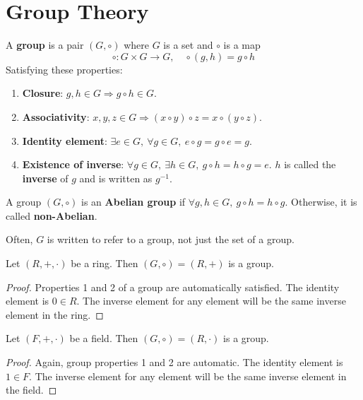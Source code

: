 \section{Group Theory}

\begin{definition}\label{def:group}
	A \textbf{group} is a pair $(G, \circ)$ where $G$ is a set and $\circ$ is a map
	\[
		\circ: G \times G \rightarrow G, \quad \circ (g, h) = g \circ h
	\]
	Satisfying these properties:
	\begin{enumerate}
		\item \textbf{Closure}: $g, h \in G \Rightarrow g \circ h \in G$.
		\item \textbf{Associativity}: $x, y, z \in G \Rightarrow (x \circ y) \circ z = x \circ (y \circ z)$.
		\item \textbf{Identity element}: $\exists e \in G, \ \forall g \in G, \ e \circ g = g \circ e = g$.
		\item \textbf{Existence of inverse}: $\forall g \in G, \ \exists h \in G, \ g \circ h = h \circ g = e$. $h$ is called the \textbf{inverse} of $g$ and is written as $g^{-1}$.
	\end{enumerate}
\end{definition}

\begin{definition}
	A group $(G, \circ)$ is an \textbf{Abelian group} if $\forall g, h \in G, \ g \circ h = h \circ g$. Otherwise, it is called \textbf{non-Abelian}.
\end{definition}

\begin{remark}
	Often, $G$ is written to refer to a group, not just the set of a group.
\end{remark}

\begin{lemma}
	Let $(R, +, \cdot)$ be a ring. Then $(G, \circ) = (R, +)$ is a group.
\end{lemma}

\begin{proof}
	Properties 1 and 2 of a group are automatically satisfied. The identity element is $0 \in R$. The inverse element for any element will be the same inverse element in the ring.
\end{proof}

\begin{lemma}
	Let $(F, +, \cdot)$ be a field. Then $(G, \circ) = (R, \cdot)$ is a group.
\end{lemma}

\begin{proof}
	Again, group properties 1 and 2 are automatic. The identity element is $1 \in F$. The inverse element for any element will be the same inverse element in the field.
\end{proof}

